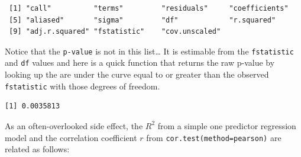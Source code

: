 \documentclass[
  letterpaper,
]{book}
\newenvironment{Shaded}{\begin{snugshade}}{\end{snugshade}}
\newcommand{\AttributeTok}[1]{\textcolor[rgb]{0.40,0.45,0.13}{#1}}
\newcommand{\ControlFlowTok}[1]{\textcolor[rgb]{0.00,0.23,0.31}{\textbf{#1}}}
\newcommand{\DecValTok}[1]{\textcolor[rgb]{0.68,0.00,0.00}{#1}}
\newcommand{\FloatTok}[1]{\textcolor[rgb]{0.68,0.00,0.00}{#1}}
\newcommand{\FunctionTok}[1]{\textcolor[rgb]{0.28,0.35,0.67}{#1}}
\newcommand{\NormalTok}[1]{\textcolor[rgb]{0.00,0.23,0.31}{#1}}
\newcommand{\OtherTok}[1]{\textcolor[rgb]{0.00,0.23,0.31}{#1}}
\newcommand{\SpecialCharTok}[1]{\textcolor[rgb]{0.37,0.37,0.37}{#1}}
\newcommand{\StringTok}[1]{\textcolor[rgb]{0.13,0.47,0.30}{#1}}
\begin{document}
\begin{verbatim}
 [1] "call"          "terms"         "residuals"     "coefficients" 
 [5] "aliased"       "sigma"         "df"            "r.squared"    
 [9] "adj.r.squared" "fstatistic"    "cov.unscaled" 
\end{verbatim}

Notice that the \texttt{p-value} is not in this list\ldots{} It is
estimable from the \texttt{fstatistic} and \texttt{df} values and here
is a quick function that returns the raw p-value by looking up the are
under the curve equal to or greater than the observed
\texttt{fstatistic} with those degrees of freedom.

\begin{Shaded}
\end{Shaded}

\begin{verbatim}
[1] 0.0035813
\end{verbatim}

As an often-overlooked side effect, the \(R^2\) from a simple one
predictor regression model and the correlation coefficient \(r\) from
\texttt{cor.test(method=\textquotesingle{}pearson\textquotesingle{})}
are related as follows:

\begin{Shaded}
\end{Shaded}
\end{document}
